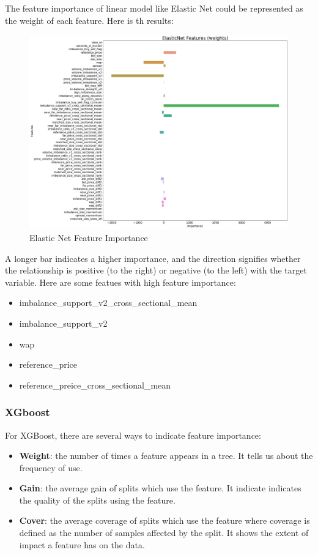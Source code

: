 \documentclass[12pt]{article}
\newtheorem{Proof of Lemma}{Proof of Lemma}
\begin{document}
The feature importance of linear model like Elastic Net could be represented as the weight of each feature. Here is th results:
\begin{figure}[H]
  \centering
  \includegraphics[width=1\linewidth]{images/ElasticNet_imp.png}
  \caption{Elastic Net Feature Importance}
  \label{fig:ElasticNet_imp}
\end{figure}
A longer bar indicates a higher importance, and the direction signifies whether the relationship is positive (to the right) or negative (to the left) with the target variable.
Here are some featues with high feature importance:
\begin{itemize}
  \item imbalance\_support\_v2\_cross\_sectional\_mean
  \item imbalance\_support\_v2
  \item wap
  \item reference\_price
  \item reference\_preice\_cross\_sectional\_mean
\end{itemize}

\subsubsection*{XGboost}

For XGBoost, there are several ways to indicate feature importance:
\begin{itemize}
  \item \textbf{Weight}: the number of times a feature appears in a tree. It tells us about the frequency of use.
  \item \textbf{Gain}: the average gain of splits which use the feature. It indicate indicates the quality of the splits using the feature.
  \item \textbf{Cover}: the average coverage of splits which use the feature where coverage is defined as the number of samples affected by the split. It shows the extent of impact a feature has on the data.
\end{itemize}
\end{document}
